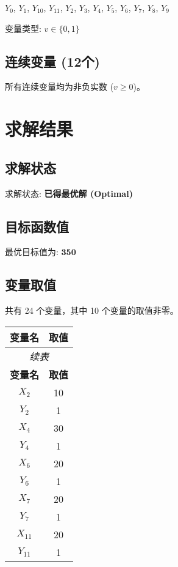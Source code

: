 \documentclass[a4paper,10pt]{article}
\begin{document}
{\small $Y_{0}$, $Y_{1}$, $Y_{10}$, $Y_{11}$, $Y_{2}$, $Y_{3}$, $Y_{4}$, $Y_{5}$, $Y_{6}$, $Y_{7}$, $Y_{8}$, $Y_{9}$}

变量类型: $v \in \{0,1\}$

\subsection{连续变量 (12个)}

所有连续变量均为非负实数 ($v \geq 0$)。

\section{求解结果}

\subsection{求解状态}

求解状态: \textbf{已得最优解 (Optimal)}

\subsection{目标函数值}

最优目标值为: $\mathbf{350}$

\subsection{变量取值}

共有 24 个变量，其中 10 个变量的取值非零。

\begin{center}
\begin{longtable}{cc}
\toprule
\textbf{变量名} & \textbf{取值} \\
\midrule
\endfirsthead
\multicolumn{2}{c}{\textit{续表}} \\
\toprule
\textbf{变量名} & \textbf{取值} \\
\midrule
\endhead
\bottomrule
\endfoot
\bottomrule
\endlastfoot
$X_{2}$ & 10 \\
$Y_{2}$ & 1 \\
$X_{4}$ & 30 \\
$Y_{4}$ & 1 \\
$X_{6}$ & 20 \\
$Y_{6}$ & 1 \\
$X_{7}$ & 20 \\
$Y_{7}$ & 1 \\
$X_{11}$ & 20 \\
$Y_{11}$ & 1 \\
\end{longtable}
\end{center}
\end{document}
